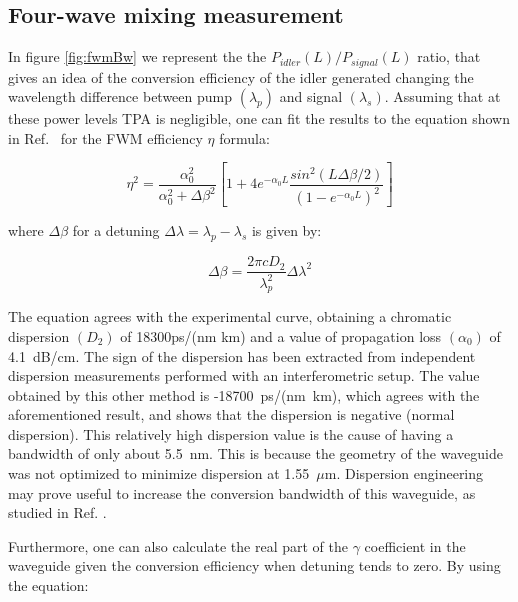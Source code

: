 \documentclass[conference]{IEEEtran}
\begin{document}
\subsection{Four-wave mixing measurement}
In figure \ref{fig:fwmBw} we represent the  the $P_{idler}(L)/P_{signal}(L)$ ratio, that gives an idea of the conversion efficiency of the idler generated changing the wavelength difference between pump $ (\lambda_p) $ and signal $ (\lambda_s) $. Assuming that at these power levels TPA is negligible, one can fit the results to the equation shown in Ref.~\cite{Vallaitis} for the FWM efficiency $ \eta $ formula:


\begin{equation}
	\eta ^2=\frac{\alpha_0^2}{\alpha_0^2+\Delta \beta^2}\left[ 1+ 4e^{-\alpha_0L}\frac{sin^2(L\Delta\beta/2)}{(1-e^{-\alpha_0L})^2} \right] \nonumber	
\end{equation}

where $ \Delta\beta $ for a detuning $ \Delta\lambda = \lambda_p-\lambda_s$ is given by:

\begin{equation}
	\Delta \beta=\frac{2\pi cD_2}{\lambda_p^2}\Delta\lambda^2 \nonumber
\end{equation}


The equation agrees with the experimental curve, obtaining a chromatic dispersion $ (D_2) $ of 18300ps/(nm km) and a value of propagation loss $ (\alpha_0) $ of 4.1~dB/cm. The sign of the dispersion has been extracted from independent dispersion measurements performed with an interferometric setup. The value obtained by this other  method is -18700~ps/(nm~km), which agrees with the aforementioned result, and shows that the dispersion is negative (normal dispersion). This relatively high dispersion value is the cause of having a bandwidth of only about 5.5~nm. This is because the geometry of the waveguide was not optimized to minimize dispersion at 1.55~$\mu$m. Dispersion engineering may prove useful to increase the conversion bandwidth of this waveguide, as studied in Ref. \cite{Caraquitena}.


Furthermore, one can also calculate the real part of the $\gamma$ coefficient in the waveguide given the conversion efficiency when detuning tends to zero. By using the equation:
\end{document}
